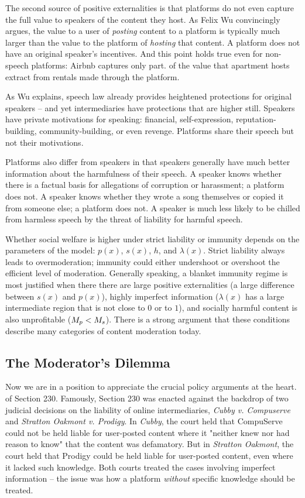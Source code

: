 The second source of positive externalities is that platforms do not even capture the full value to speakers of the content they host. As Felix Wu convincingly argues, the value to a user of \emph{posting} content to a platform is typically much larger than the value to the platform of \emph{hosting} that content. A platform does not have an original speaker's incentives. And this point holds true even for non-speech platforms: Airbnb captures only part. of the value that apartment hosts extract from rentals made through the platform.

As Wu explains, speech law already provides heightened protections for original speakers -- and yet intermediaries have protections that are higher still. Speakers have private motivations for speaking: financial, self-expression, reputation-building, community-building, or even revenge. Platforms share their speech but not their motivations.

Platforms also differ from speakers in that speakers generally have much better information about the harmfulness of their speech. A speaker knows whether there is a factual basis for allegations of corruption or harassment; a platform does not. A speaker knows whether they wrote a song themselves or copied it from someone else; a platform does not. A speaker is much less likely to be chilled from harmless speech by the threat of liability for harmful speech.

Whether social welfare is higher under strict liability or immunity depends on the parameters of the model:  $p(x)$, $s(x)$, $h$, and $\lambda(x)$. Strict liability always leads to overmoderation; immunity could either undershoot or overshoot the efficient level of moderation. Generally speaking, a blanket immunity regime is most justified when there there are large positive externalities (a large difference between $s(x)$ and $p(x)$), highly imperfect information ($\lambda(x)$ has a large intermediate region that is not close to $0$ or to $1$), and socially harmful content is also unprofitable ($M_p < M_s$).
 There is a strong argument that these conditions describe many categories of content moderation today.

\subsection{The Moderator's Dilemma}
\label{sec:dilemma}

Now we are in a position to appreciate the crucial policy arguments at the heart. of Section 230. Famously, Section 230 was enacted against the backdrop of two judicial decisions on the liability of online intermediaries, \emph{Cubby v. Compuserve} and \emph{Stratton Oakmont v. Prodigy}. In \emph{Cubby}, the court held that CompuServe could not be held liable for user-posted content where it "neither knew nor had reason to know" that the content was defamatory. But in \emph{Stratton Oakmont}, the court held that Prodigy could be held liable for user-posted content, even where it lacked such knowledge. Both courts treated the cases involving imperfect information -- the issue was how a platform \emph{without} specific knowledge should be treated.

